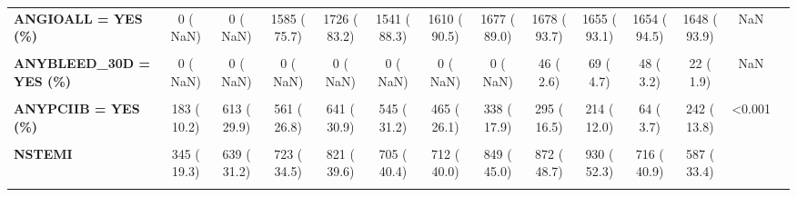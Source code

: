 \documentclass[
]{article}
\begin{document}
\begin{table}[H]
\begin{tabular}[t]{>{\raggedright\arraybackslash}p{5em}ccccccccccccc}
\textbf{ANGIOALL = YES (\%)} & 0 (  NaN) & 0 (  NaN) & 1585 ( 75.7) & 1726 ( 83.2) & 1541 ( 88.3) & 1610 ( 90.5) & 1677 ( 89.0) & 1678 ( 93.7) & 1655 ( 93.1) & 1654 ( 94.5) & 1648 ( 93.9) & NaN & \\
\textbf{\cellcolor{gray!10}{ANTERIOR = YES (\%)}} & \cellcolor{gray!10}{687 ( 38.3)} & \cellcolor{gray!10}{724 ( 35.4)} & \cellcolor{gray!10}{664 ( 31.7)} & \cellcolor{gray!10}{691 ( 33.3)} & \cellcolor{gray!10}{531 ( 30.4)} & \cellcolor{gray!10}{532 ( 29.9)} & \cellcolor{gray!10}{316 ( 16.8)} & \cellcolor{gray!10}{308 ( 17.2)} & \cellcolor{gray!10}{278 ( 15.6)} & \cellcolor{gray!10}{347 ( 19.8)} & \cellcolor{gray!10}{289 ( 16.5)} & \cellcolor{gray!10}{<0.001} & \cellcolor{gray!10}{}\\
\textbf{ANYBLEED\_30D = YES (\%)} & 0 (  NaN) & 0 (  NaN) & 0 (  NaN) & 0 (  NaN) & 0 (  NaN) & 0 (  NaN) & 0 (  NaN) & 46 (  2.6) & 69 (  4.7) & 48 (  3.2) & 22 (  1.9) & NaN & \\
\textbf{\cellcolor{gray!10}{ANYPCI = YES (\%)}} & \cellcolor{gray!10}{673 ( 37.5)} & \cellcolor{gray!10}{1003 ( 49.0)} & \cellcolor{gray!10}{1189 ( 56.8)} & \cellcolor{gray!10}{1298 ( 62.6)} & \cellcolor{gray!10}{1197 ( 68.6)} & \cellcolor{gray!10}{1269 ( 71.3)} & \cellcolor{gray!10}{1305 ( 69.2)} & \cellcolor{gray!10}{1290 ( 72.0)} & \cellcolor{gray!10}{1131 ( 63.6)} & \cellcolor{gray!10}{1381 ( 78.9)} & \cellcolor{gray!10}{1363 ( 77.7)} & \cellcolor{gray!10}{<0.001} & \cellcolor{gray!10}{}\\
\textbf{ANYPCIIB = YES (\%)} & 183 ( 10.2) & 613 ( 29.9) & 561 ( 26.8) & 641 ( 30.9) & 545 ( 31.2) & 465 ( 26.1) & 338 ( 17.9) & 295 ( 16.5) & 214 ( 12.0) & 64 (  3.7) & 242 ( 13.8) & <0.001 & \\
\textbf{\cellcolor{gray!10}{ARR\_DIAG (\%)}} & \cellcolor{gray!10}{} & \cellcolor{gray!10}{} & \cellcolor{gray!10}{} & \cellcolor{gray!10}{} & \cellcolor{gray!10}{} & \cellcolor{gray!10}{} & \cellcolor{gray!10}{} & \cellcolor{gray!10}{} & \cellcolor{gray!10}{} & \cellcolor{gray!10}{} & \cellcolor{gray!10}{} & \cellcolor{gray!10}{<0.001} & \cellcolor{gray!10}{}\\
\textbf{NSTEMI} & 345 ( 19.3) & 639 ( 31.2) & 723 ( 34.5) & 821 ( 39.6) & 705 ( 40.4) & 712 ( 40.0) & 849 ( 45.0) & 872 ( 48.7) & 930 ( 52.3) & 716 ( 40.9) & 587 ( 33.4) &  & \\
\textbf{\cellcolor{gray!10}{STE MI}} & \cellcolor{gray!10}{1009 ( 56.4)} & \cellcolor{gray!10}{1013 ( 49.5)} & \cellcolor{gray!10}{1031 ( 49.2)} & \cellcolor{gray!10}{915 ( 44.2)} & \cellcolor{gray!10}{773 ( 44.3)} & \cellcolor{gray!10}{784 ( 44.1)} & \cellcolor{gray!10}{756 ( 40.1)} & \cellcolor{gray!10}{713 ( 39.8)} & \cellcolor{gray!10}{706 ( 39.7)} & \cellcolor{gray!10}{705 ( 40.3)} & \cellcolor{gray!10}{670 ( 38.2)} & \cellcolor{gray!10}{} & \cellcolor{gray!10}{}\\

\end{tabular}
\end{table}
\end{document}
